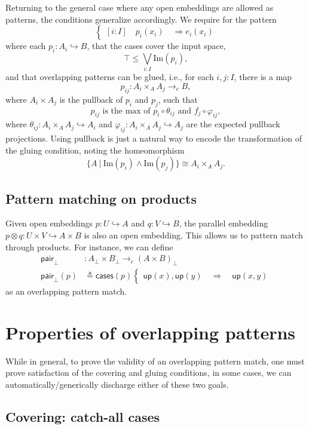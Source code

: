 \documentclass[conference]{IEEEtran}
\newcommand{\hookto}{\hookrightarrow}
\newcommand{\cto}{\to_c}
\newcommand{\suchthat}{\ |\ }
\newcommand{\Img}[1]{\text{Im}\left({#1}\right)}
\newcommand{\Branch}{\Rightarrow}
\newcommand{\up}{\mathsf{up}}
\newcommand{\isthemaxof}[3]{{#1}\text{ is the max of }{#2}\text{ and }{#3}}
\begin{document}
Returning to the general case where any open embeddings are allowed as patterns, the conditions generalize accordingly. We require for the pattern
\[
\begin{cases}
[i : I] \quad p_i(x_i) \quad \Branch e_i(x_i)
\end{cases}
\]
where each $p_i : A_i \hookto B$, that the cases cover the input space,
\[
\top \le \bigvee_{i : I} \Img{p_i},
\]
and that overlapping patterns can be glued, i.e., for each $i, j : I$, there is a map
\[
p_{ij} : A_i \times_A A_j \cto B,
\]
where $A_i \times A_j$ is the pullback of $p_i$ and $p_j$, such that 
\[
\isthemaxof{ p_{ij} }{ p_i \circ \theta_{ij}}{ f_j \circ \varphi_{ij}},
\]
where $\theta_{ij} : A_i \times_A A_j \hookto A_i$ and $\varphi_{ij} : A_i \times_A A_j \hookto A_j$ are the expected pullback projections. Using pullback is just a natural way to encode the transformation of the gluing condition, noting the homeomorphism
\[
 \{A \suchthat \Img{p_i} \wedge \Img{p_j} \} \cong A_i \times_A A_j.
\]

\subsection{Pattern matching on products}

Given open embeddings $p : U \hookto A$ and $q : V \hookto B$, the parallel embedding $p \otimes q : U \times V \hookto A \times B$ is also an open embedding. This allows us to pattern match through products. 
For instance, we can define
\begin{align*}
 \mathsf{pair}_\bot &: A_\bot \times B_\bot \cto \left( A \times B \right)_\bot
\\ \mathsf{pair}_\bot(p) &\triangleq \mathsf{cases}(p)
\begin{cases}
\up(x) , \up(y)
  \quad \Branch \quad \up(x, y)
\end{cases}
\end{align*}
as an overlapping pattern match.

\section{Properties of overlapping patterns}
\label{s:properties}

While in general, to prove the validity of an overlapping pattern match, one must prove satisfaction of the covering and gluing conditions, in some cases, we can automatically/generically discharge either of these two goals. 

\subsection{Covering: catch-all cases}
\end{document}
